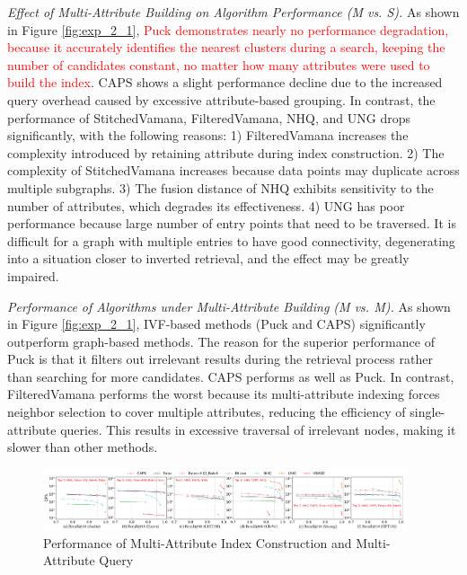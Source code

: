 \documentclass[sigconf, nonacm]{acmart}
\begin{document}
{	\textit{Effect of Multi-Attribute Building on Algorithm Performance (M vs. S).}
	As shown in Figure \ref{fig:exp_2_1}, \textcolor{red}{Puck demonstrates nearly no performance degradation, because it accurately identifies the nearest clusters during a search, keeping the number of candidates constant, no matter how many attributes were used to build the index}. CAPS shows a slight performance decline due to the increased query overhead caused by excessive attribute-based grouping. In contrast, the performance of StitchedVamana, FilteredVamana, NHQ, and UNG drops significantly, with the following reasons: 1) FilteredVamana increases the complexity introduced by retaining attribute during index construction. 2) The complexity of StitchedVamana increases because data points may duplicate across multiple subgraphs. 3) The fusion distance of NHQ exhibits sensitivity to the number of attributes, which degrades its effectiveness. 4) UNG has poor performance because large number of entry points that need to be traversed. It is difficult for a graph with multiple entries to have good connectivity, degenerating into a situation closer to inverted retrieval, and the effect may be greatly impaired.
	
	
	
	\textit{Performance of Algorithms under Multi-Attribute Building (M vs. M).}  
	As shown in Figure \ref{fig:exp_2_1}, IVF-based methods (Puck and CAPS) significantly outperform graph-based methods. The reason for the superior performance of Puck is that it filters out irrelevant results during the retrieval process rather than searching for more candidates. CAPS performs as well as Puck. In contrast, FilteredVamana performs the worst because its multi-attribute indexing forces neighbor selection to cover multiple attributes, reducing the efficiency of single-attribute queries. This results in excessive traversal of irrelevant nodes, making it slower than other methods.
	
	
	\begin{figure}
		\centering
		
		\includegraphics[width=0.95\textwidth]{figures/exp/exp_4_1_MultiLabel_1thread.pdf}
		\caption{Performance of Multi-Attribute Index Construction and Multi-Attribute Query}
		\label{fig:exp_4_1_MultiLabel_1thread}
	\end{figure}
	
}
\end{document}
